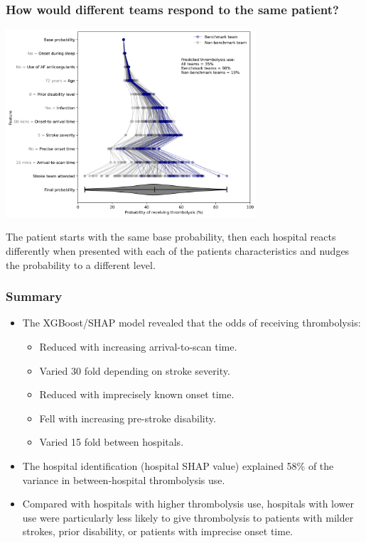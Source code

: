 \documentclass{beamer}
\begin{document}
\begin{frame}
\frametitle{How would different teams respond to the same patient?}

    \begin{center}
    \includegraphics[width=0.7\textwidth]{./images/21_shap_waterfall_with_violin_contentious.jpg}
    \end{center}

\footnotesize The patient starts with the same base probability, then each hospital reacts differently when presented with each of the patients characteristics and nudges the probability to a different level.

\end{frame}



\begin{frame}
\frametitle{Summary}
\small

\begin{itemize}
    \item The XGBoost/SHAP model revealed that the odds of receiving thrombolysis:

    \begin{itemize}
        \item Reduced with increasing arrival-to-scan time.
        \item Varied 30 fold depending on stroke severity.
        \item Reduced with imprecisely known onset time.
        \item Fell with increasing pre-stroke disability.
        \item Varied 15 fold between hospitals. 
    \end{itemize}

\item The hospital identification (hospital SHAP value) explained 58\% of the variance in between-hospital thrombolysis use. 

\item Compared with hospitals with higher thrombolysis use, hospitals with lower use were particularly less likely to give thrombolysis to patients with milder strokes, prior disability, or patients with imprecise onset time.
\end{itemize}

\end{frame}

\end{document}
